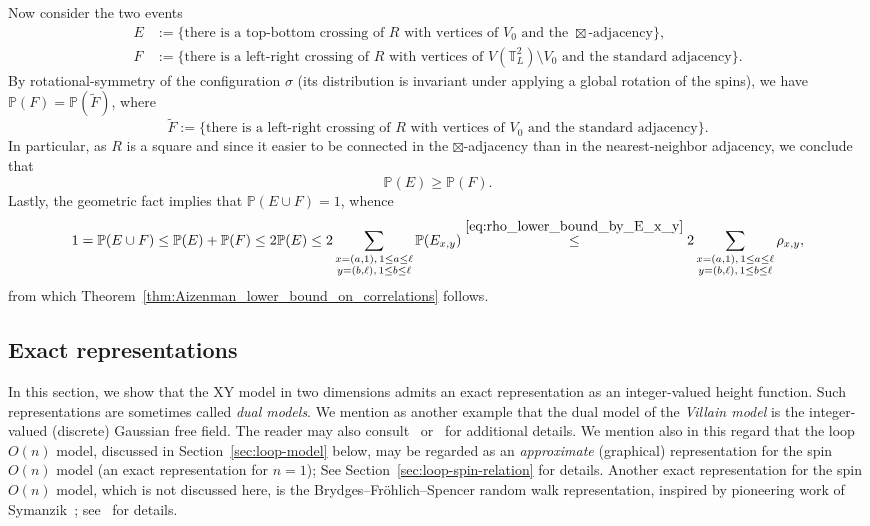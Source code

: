 \documentclass[12pt,reqno]{article}
\def\P{\mathbb{P}}
\def\T{\mathbb{T}}
\begin{document}
Now consider the two events
\begin{align*}
  E &:= \{\text{there is a top-bottom crossing of $R$ with vertices of $V_0$ and the $\boxtimes$-adjacency}\},\\
  F &:= \{\text{there is a left-right crossing of $R$ with vertices of $V(\T_L^2)\setminus V_0$ and the standard adjacency}\}.
\end{align*}
By rotational-symmetry of the configuration $\sigma$ (its distribution is invariant under applying a global rotation of the spins), we have $\P(F) = \P(\tilde{F})$, where
\begin{equation*}
  \tilde{F}:=\{\text{there is a left-right crossing of $R$ with vertices of $V_0$ and the standard adjacency}\}.
\end{equation*}
In particular, as $R$ is a square and since it easier to be connected in the $\boxtimes$-adjacency than in the nearest-neighbor adjacency, we conclude that
\[
  \P(E) \ge \P(F).
\]
Lastly, the geometric fact implies that $\P(E\cup F) = 1$, whence
\begin{equation}\label{eq:stronger_conclusion_Aizenman_theorem}
  1 = \P(E\cup F) \le \P(E) + \P(F) \le 2\P(E) \le 2\sum_{\substack{x=(a,1),\, 1\le a\le \ell\\ y=(b,\ell),\, 1\le b\le \ell}}\P(E_{x,y})\stackrel{\eqref{eq:rho_lower_bound_by_E_x_y}}{\le} 2\sum_{\substack{x=(a,1),\, 1\le a\le \ell\\ y=(b,\ell),\, 1\le b\le \ell}}\rho_{x,y},
\end{equation}
from which Theorem~\ref{thm:Aizenman_lower_bound_on_correlations} follows.





\subsection{Exact representations}\label{sec:exact_representations}

In this section, we show that the XY model in two dimensions admits an exact representation as an integer-valued height function. Such representations are sometimes called \emph{dual models}. We mention as another example that the dual model of the \emph{Villain model} is the integer-valued (discrete) Gaussian free field. The reader may also consult~\cite[Appendix~A]{FroSpe81} or~\cite[Section 6.1]{kharash2017fr} for additional details.
We mention also in this regard that the loop $O(n)$ model, discussed in Section~\ref{sec:loop-model} below, may be regarded as an \emph{approximate} (graphical) representation for the spin $O(n)$ model (an exact representation for $n=1$); See Section~\ref{sec:loop-spin-relation} for details. Another exact representation for the spin $O(n)$ model, which is not discussed here, is the Brydges--Fr\"ohlich--Spencer random walk representation, inspired by pioneering work of Symanzik~\cite{Symanzik1968}; see~\cite{brydges1982random, fernandez2013random} for details.
\end{document}

